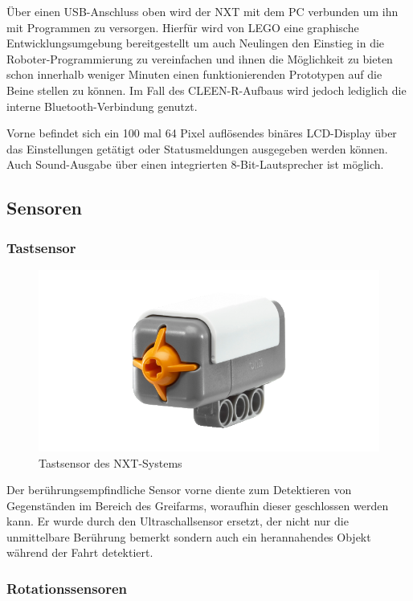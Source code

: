 Über einen USB-Anschluss oben wird der NXT mit dem PC verbunden um ihn mit Programmen zu versorgen. Hierfür wird von LEGO eine graphische Entwicklungsumgebung bereitgestellt um auch Neulingen den Einstieg in die Roboter-Programmierung zu vereinfachen und ihnen die Möglichkeit zu bieten schon innerhalb weniger Minuten einen funktionierenden Prototypen auf die Beine stellen zu können. Im Fall des CLEEN-R-Aufbaus wird jedoch lediglich die interne Bluetooth-Verbindung genutzt.

Vorne befindet sich ein 100 mal 64 Pixel auflösendes binäres LCD-Display über das Einstellungen getätigt oder Statusmeldungen ausgegeben werden können. Auch Sound-Ausgabe über einen integrierten 8-Bit-Lautsprecher ist möglich.

\subsection{Sensoren}

\subsubsection{Tastsensor}

\begin{figure}[h]
\centering
\includegraphics[width=\textwidth/3]{Bilder/Robot/button_sensor}
\caption{Tastsensor des NXT-Systems}
\label{fig:buttonSensor}
\end{figure}

Der berührungsempfindliche Sensor vorne diente zum Detektieren von Gegenständen im Bereich des Greifarms, woraufhin dieser geschlossen werden kann. Er wurde durch den Ultraschallsensor ersetzt, der nicht nur die unmittelbare Berührung bemerkt sondern auch ein herannahendes Objekt während der Fahrt detektiert.

\subsubsection{Rotationssensoren}

